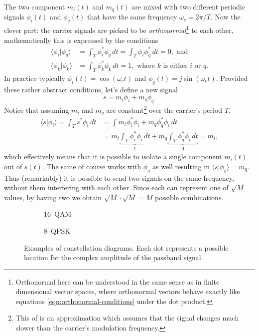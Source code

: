 The two component \(m_i(t)\) and \(m_q(t)\) are mixed with two different periodic signals \(\phi_i(t)\) and \(\phi_q(t)\) that have the same frequency \(\omega_c = 2\pi / T\). Now the clever part: the carrier signals are picked to be \emph{orthonormal}\footnote{Orthonormal here can be understood in the same sense as in finite dimensional vector spaces, where orthonormal vectors behave exactly like equations \eqref{eqn:orthonormal-conditions} under the dot product.} to each other, mathematically this is expressed by the conditions
\begin{subequations} \label{eqn:orthonormal-conditions}
	\begin{align}
		\langle \phi_i | \phi_q \rangle
			&= \int_T \phi_i^* \phi_q \, dt = \int_T \phi_i \phi_q^* \, dt
			= 0, \text{ and } \\
		\langle \phi_k | \phi_k \rangle
			&= \int_T \phi_k^* \phi_k \,dt = 1,
			\text{ where } k \text{ is either } i \text{ or } q.
	\end{align}
\end{subequations}
In practice typically \(\phi_i(t) = \cos(\omega_c t)\) and \(\phi_q(t) = j\sin(\omega_c t)\).  Provided these rather abstract conditions, let's define a new signal 
\begin{equation}
	s = m_i\phi_i + m_q\phi_q.
\end{equation}
Notice that assuming \(m_i\) and \(m_q\) are constant\footnote{This of is an approximation which assumes that the signal changes much slower than the carrier's modulation frequency.} over the carrier's period \(T\),
\begin{align*}
	\langle s | \phi_i \rangle = \int_T s^* \phi_i \,dt
		&= \int m_i \phi_i^* \phi_i + m_q \phi_q^* \phi_i \,dt \\
		&= m_i \underbrace{\int_T \phi_i^* \phi_i \,dt}_{1}
			+ m_q \underbrace{\int_T \phi_q^* \phi_i \,dt}_{0} = m_i,
\end{align*}
which effectively means that it is possible to isolate a single component \(m_i(t)\) out of \(s(t)\). The same of course works with \(\phi_q\) as well resulting in \(\langle s | \phi_q \rangle = m_q\). Thus (remarkably) it is possible to send two signals on the same frequency, without them interfering with each other. Since each can represent one of \(\sqrt{M}\) values, by having two we obtain \(\sqrt{M} \cdot \sqrt{M} = M\) possible combinations.

\begin{figure}
	\hfill
	\begin{subfigure}{.4\linewidth}
		
		\caption{16--QAM}
	\end{subfigure}
	\hfill
	\begin{subfigure}{.4\linewidth}
		
		\caption{8--QPSK}
	\end{subfigure}
	\hfill
	\caption{
		Examples of constellation diagrams. Each dot represents a possible location for the complex amplitude of the passband signal.
		\label{fig:qam-constellation}
	}
\end{figure}

